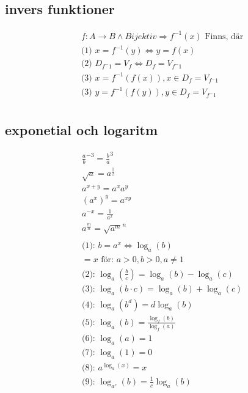 \begin{multicols}{2}
  \subsection{invers funktioner} 
  \begin{align*}
    & f: A \to B \land Bijektiv \Rightarrow f^{-1}(x) \text{ Finns, där}  \\
    &\text{(1) }  x = f^{-1}(y) \Leftrightarrow y = f(x) \\
    &\text{(2) }  D_{f^-1} = V_f \Leftrightarrow D_f = V_{f^-1} \\
    &\text{(3) }  x = f^{-1}(f(x)), x \in D_f = V_{f^-1} \\ 
    &\text{(3) }  y = f^{-1}(f(y)), y \in D_f = V_{f^-1} \\ 
  \end{align*}


  \subsection{exponetial och logaritm}  %
  \begin{align*}
    &{\frac{a}{b}}^{-3} = {\frac{b}{a}}^{3} \\
    &\sqrt{a} = a^{\frac{1}{2}} \\
    &a^{x+y}=a^{x}a^{y} \\
    &{(a^{x})}^y=a^{xy} \\
    &a^{-x}=\frac{1}{a^x} \\
    &a^{\frac{m}{n}}={\sqrt{a^{m}}}^{n} \\
    & \\
    &\text{(1): } b = a^x \Leftrightarrow \log_a(b) \\
    &= x  \text{ för: } a>0, b>0, a \ne 1  \\
    &\text{(2): } \log_a(\frac{b}{c}) = \log_a(b) - \log_a(c) \\
    &\text{(3): } \log_a(b \cdot c) = \log_a(b) + \log_a(c) \\
    &\text{(4): } \log_a(b^d) = d\log_a(b) \\
    &\text{(5): } \log_a(b) = \frac{\log_f(b)}{\log_f(a)} \\
    &\text{(6): } \log_a(a) = 1 \\
    &\text{(7): } \log_a(1) = 0 \\
    &\text{(8): } a^{\log_a(x)} = x \\
    &\text{(9): } \log_{a^c}(b) = \frac{1}{c} \log_a(b) \\
  \end{align*}


\end{multicols}
